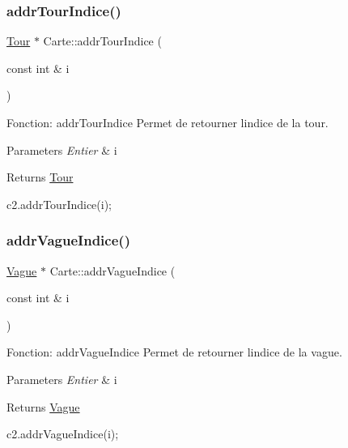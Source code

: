 \subsubsection{\texorpdfstring{addr\+Tour\+Indice()}{addrTourIndice()}}
{\footnotesize\ttfamily \hyperlink{classTour}{Tour} $\ast$ Carte\+::addr\+Tour\+Indice (\begin{DoxyParamCaption}\item[{const int \&}]{i }\end{DoxyParamCaption})}



Fonction\+: addr\+Tour\+Indice Permet de retourner l\textquotesingle{}indice de la tour. 


\begin{DoxyParams}{Parameters}
{\em Entier} & i \\
\hline
\end{DoxyParams}
\begin{DoxyReturn}{Returns}
\hyperlink{classTour}{Tour} 
\begin{DoxyCode}
c2.addrTourIndice(i);
\end{DoxyCode}
 
\end{DoxyReturn}
\mbox{\label{classCarte_a21708cf932e4d0e74ed0222f7950582a}} 
\subsubsection{\texorpdfstring{addr\+Vague\+Indice()}{addrVagueIndice()}}
{\footnotesize\ttfamily \hyperlink{classVague}{Vague} $\ast$ Carte\+::addr\+Vague\+Indice (\begin{DoxyParamCaption}\item[{const int \&}]{i }\end{DoxyParamCaption})}



Fonction\+: addr\+Vague\+Indice Permet de retourner l\textquotesingle{}indice de la vague. 


\begin{DoxyParams}{Parameters}
{\em Entier} & i \\
\hline
\end{DoxyParams}
\begin{DoxyReturn}{Returns}
\hyperlink{classVague}{Vague} 
\begin{DoxyCode}
c2.addrVagueIndice(i);
\end{DoxyCode}
 
\end{DoxyReturn}
\mbox{\label{classCarte_aef8696f9e6017496583bf32fb7cceb80}} 
